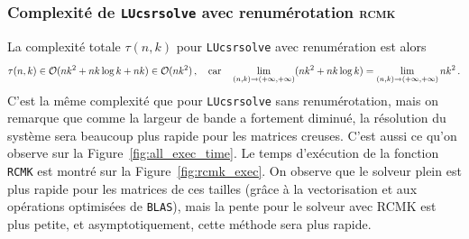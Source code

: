 \documentclass[11pt]{article}
\begin{document}
\subsubsection{Complexité de \texttt{LUcsrsolve} avec renumérotation \textsc{rcmk}}
La complexité totale $\tau(n, k)$ pour \lstinline|LUcsrsolve| avec renumération est alors
\[
\tau(n, k) \in \mathcal{O}(nk^2 + nk \log k + nk) \in \mathcal{O}(nk^2)\,,\quad \textnormal{car} \quad \lim_{(n, k) \to (+\infty, +\infty)} (nk^2 + nk \log k) = \lim_{(n, k) \to (+\infty, +\infty)} nk^2\,.
\]
C'est la même complexité que pour \lstinline|LUcsrsolve| sans renumérotation, mais on remarque que comme la largeur de bande a fortement diminué, la résolution du système sera beaucoup plus rapide pour les matrices creuses.
C'est aussi ce qu'on observe sur la Figure~\ref{fig:all_exec_time}.
Le temps d'exécution de la fonction \lstinline|RCMK| est montré sur la Figure~\ref{fig:rcmk_exec}.
On observe que le solveur plein est plus rapide pour les matrices de ces tailles (grâce à la vectorisation et aux opérations optimisées de \lstinline[language=bash]|BLAS|), mais la pente pour le solveur avec \textsc{RCMK} est plus petite, et asymptotiquement, cette méthode sera plus rapide.
\end{document}
